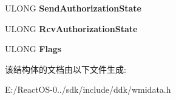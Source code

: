 \begin{DoxyCompactItemize}
\mbox{\label{struct___m_s_ndis___port_state_data_a66c7471e5698169ff9187e13a35af90e}} 
U\+L\+O\+NG {\bfseries Send\+Authorization\+State}
\item 
\mbox{\label{struct___m_s_ndis___port_state_data_a3b1c53faf9a701f9a57178393cfb191a}} 
U\+L\+O\+NG {\bfseries Rcv\+Authorization\+State}
\item 
\mbox{\label{struct___m_s_ndis___port_state_data_a992fedf24b93cced9e4e848a1ab9796a}} 
U\+L\+O\+NG {\bfseries Flags}
\end{DoxyCompactItemize}


该结构体的文档由以下文件生成\+:\begin{DoxyCompactItemize}
\item 
E\+:/\+React\+O\+S-\/0../sdk/include/ddk/wmidata.\+h\end{DoxyCompactItemize}
